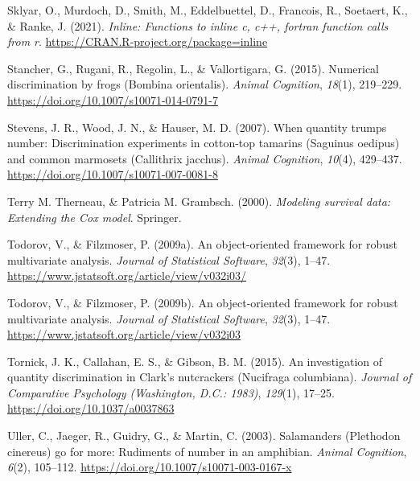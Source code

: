 \documentclass[
  ,doc,floatsintext]{apa6}
\newlength{\cslhangindent}
\newlength{\cslentryspacingunit} %
\newenvironment{CSLReferences}[2] %
 {%
  \setlength{\parindent}{0pt}
  \ifodd #1
  \let\oldpar\par
  \def\par{\hangindent=\cslhangindent\oldpar}
  \fi
  \setlength{\parskip}{#2\cslentryspacingunit}
 }%
 {}
\begin{document}
\begin{CSLReferences}{1}{0}
\leavevmode{}%
Sklyar, O., Murdoch, D., Smith, M., Eddelbuettel, D., Francois, R., Soetaert, K., \& Ranke, J. (2021). \emph{Inline: Functions to inline c, c++, fortran function calls from r}. \url{https://CRAN.R-project.org/package=inline}

\leavevmode{}%
Stancher, G., Rugani, R., Regolin, L., \& Vallortigara, G. (2015). Numerical discrimination by frogs ({Bombina} orientalis). \emph{Animal Cognition}, \emph{18}(1), 219--229. \url{https://doi.org/10.1007/s10071-014-0791-7}

\leavevmode{}%
Stevens, J. R., Wood, J. N., \& Hauser, M. D. (2007). When quantity trumps number: Discrimination experiments in cotton-top tamarins ({Saguinus} oedipus) and common marmosets ({Callithrix} jacchus). \emph{Animal Cognition}, \emph{10}(4), 429--437. \url{https://doi.org/10.1007/s10071-007-0081-8}

\leavevmode{}%
Terry M. Therneau, \& Patricia M. Grambsch. (2000). \emph{Modeling survival data: Extending the {C}ox model}. Springer.

\leavevmode{}%
Todorov, V., \& Filzmoser, P. (2009a). An object-oriented framework for robust multivariate analysis. \emph{Journal of Statistical Software}, \emph{32}(3), 1--47. \url{https://www.jstatsoft.org/article/view/v032i03/}

\leavevmode{}%
Todorov, V., \& Filzmoser, P. (2009b). An object-oriented framework for robust multivariate analysis. \emph{Journal of Statistical Software}, \emph{32}(3), 1--47. \url{https://www.jstatsoft.org/article/view/v032i03}

\leavevmode{}%
Tornick, J. K., Callahan, E. S., \& Gibson, B. M. (2015). An investigation of quantity discrimination in {Clark}'s nutcrackers ({Nucifraga} columbiana). \emph{Journal of Comparative Psychology (Washington, D.C.: 1983)}, \emph{129}(1), 17--25. \url{https://doi.org/10.1037/a0037863}

\leavevmode{}%
Uller, C., Jaeger, R., Guidry, G., \& Martin, C. (2003). Salamanders ({Plethodon} cinereus) go for more: Rudiments of number in an amphibian. \emph{Animal Cognition}, \emph{6}(2), 105--112. \url{https://doi.org/10.1007/s10071-003-0167-x}


\end{CSLReferences}
\end{document}
